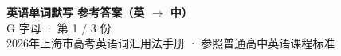 \documentclass[10pt,a4paper]{article}
\begin{document}
\pagestyle{plain}

\begin{center}
{\LARGE\bfseries 英语单词默写 \quad 参考答案（英 $\to$ 中）}\\[0.22em]
{\large G 字母 · 第 1 / 3 份}\\[0.18em]
{\small 2026年上海市高考英语词汇用法手册 · 参照普通高中英语课程标准}
\end{center}

\vspace{0.2em}
\noindent{\color{rulegray}\rule{\textwidth}{0.8pt}}

\vspace{0.35em}

\vspace{0.25em}
\renewcommand{\arraystretch}{1.32}
\end{document}
